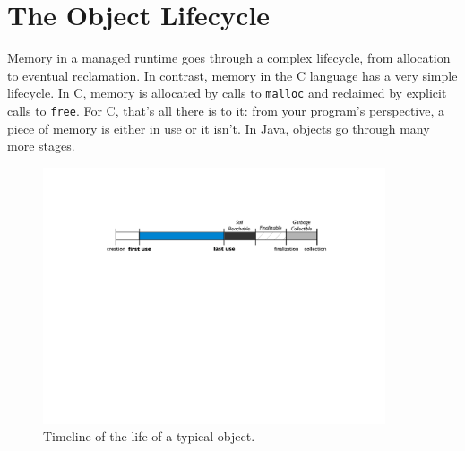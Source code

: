 \section{The Object Lifecycle}

Memory in a managed runtime goes through a complex lifecycle, from allocation to
eventual reclamation. In contrast, memory in the C language has a very simple
lifecycle. In C, memory is allocated by calls to {\tt malloc} and reclaimed by
explicit calls to {\tt free}. For C, that's all there is to it: from your
program's perspective, a piece of memory is either in use or it isn't. In Java,
objects go through many more stages. 




\begin{figure}
	\includegraphics[width=0.9\textwidth]{part2/Figures/lifetime/object-lifecycle}
	\caption{Timeline of the life of a typical object.}
	\label{fig:typical-lifecycle}
\end{figure}


